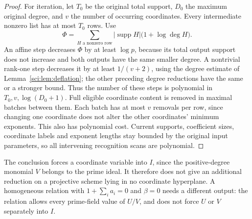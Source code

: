\begin{proof}
For iteration, let $T_0$ be the original total support, $D_0$ the
maximum original degree, and $v$ the number of occurring coordinates.
Every intermediate nonzero list has at most $T_0$ rows. Use
\[
 \Phi=\sum_{H\text{ a nonzero row}}
      |\operatorname{supp}H|\bigl(1+\log\deg H\bigr).
\]
An affine step decreases $\Phi$ by at least $\log p$, because its
total output support does not increase and both outputs have the
same smaller degree. A nontrivial rank-one step decreases it by at
least $1/(v+2)$, using the degree estimate of
Lemma~\ref{sci:lem:deflation}; the other preceding degree reductions
have the same or a stronger bound. Thus the number of these steps
is polynomial in $T_0,v,\log(D_0+1)$. Full eligible coordinate content
is removed in maximal batches between them. Each batch has at most
$v$ removals per row, since changing one coordinate does not alter
the other coordinates' minimum exponents. This also has polynomial
cost. Current supports, coefficient sizes, coordinate labels and
exponent lengths stay bounded by the original input parameters, so
all intervening recognition scans are polynomial.
\end{proof}

The conclusion forces a coordinate variable into $I$, since the
positive-degree monomial $V$ belongs to the prime ideal. It therefore
does not give an additional reduction on a projective scheme lying
in no coordinate hyperplane. A homogeneous relation with
$1+\sum_i a_i=0$ and $\beta=0$ needs a different output: the relation
allows every prime-field value of $U/V$, and does not force $U$ or
$V$ separately into $I$.

